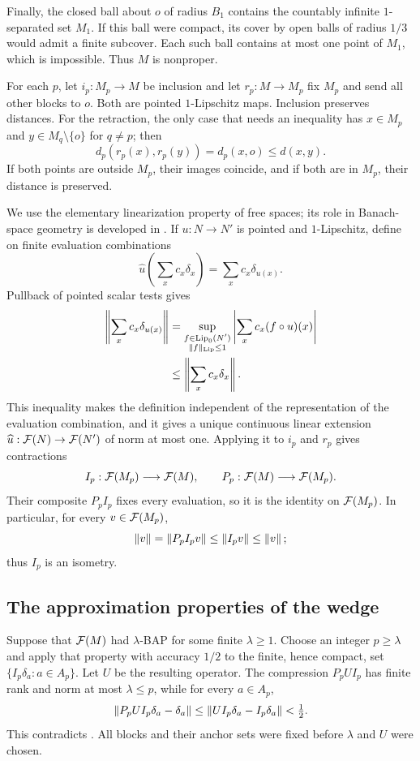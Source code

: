 Finally, the closed ball about $o$ of radius $B_1$ contains the
countably infinite $1$-separated set $M_1$. If this ball were compact,
its cover by open balls of radius $1/3$ would admit a finite subcover.
Each such ball contains at most one point of $M_1$, which is impossible.
Thus $M$ is nonproper.

For each $p$, let $i_p:M_p\to M$ be inclusion and let $r_p:M\to M_p$
fix $M_p$ and send all other blocks to $o$. Both are pointed
$1$-Lipschitz maps. Inclusion preserves distances. For the retraction,
the only case that needs an inequality has $x\in M_p$ and
$y\in M_q\setminus\{o\}$ for $q\ne p$; then
\[
 d_p(r_p(x),r_p(y))=d_p(x,o)\le d(x,y).
\]
If both points are outside $M_p$, their images coincide, and if both
are in $M_p$, their distance is preserved.

We use the elementary linearization property of free spaces; its role
in Banach-space geometry is developed in \cite[\S2]{GodefroyKalton03}.
If $u:N\to N'$ is pointed and $1$-Lipschitz, define on finite evaluation
combinations
\[
 \widehat u\left(\sum_x c_x\delta_x\right)=\sum_x c_x\delta_{u(x)}.
\]
Pullback of pointed scalar tests gives
\begin{align*}
 \left\|\sum_x c_x\delta_{u(x)}\right\|
 &=\sup_{\substack{f\in\operatorname{Lip}_0(N')\\\|f\|_{\mathrm{Lip}}\le1}}
       \left|\sum_x c_x(f\circ u)(x)\right|\\
 &\le\left\|\sum_x c_x\delta_x\right\|.
\end{align*}
This inequality makes the definition independent of the representation
of the evaluation combination, and it gives a unique continuous linear
extension $\widehat u:\mathcal F(N)\to\mathcal F(N')$ of norm at most one.
Applying it to $i_p$ and $r_p$ gives contractions
\[
 I_p:\mathcal F(M_p)\longrightarrow\mathcal F(M),\qquad
 P_p:\mathcal F(M)\longrightarrow\mathcal F(M_p).
\]
Their composite $P_pI_p$ fixes every evaluation, so it is the identity
on $\mathcal F(M_p)$. In particular, for every $v\in\mathcal F(M_p)$,
\[
 \left\|v\right\|=\left\|P_pI_pv\right\|\le\left\|I_pv\right\|\le\left\|v\right\|;
\]
thus $I_p$ is an isometry.

\subsection{The approximation properties of the wedge}

Suppose that $\mathcal F(M)$ had $\lambda$-BAP for some finite $\lambda\ge1$.
Choose an integer $p\ge\lambda$ and apply that property with accuracy
$1/2$ to the finite, hence compact, set
$\{I_p\delta_a:a\in A_p\}$. Let $U$ be the resulting operator.
The compression $P_pUI_p$ has finite rank and norm at most
$\lambda\le p$, while for every $a\in A_p$,
\[
 \left\|P_pUI_p\delta_a-\delta_a\right\|
 \le\left\|UI_p\delta_a-I_p\delta_a\right\|<\tfrac12.
\]
This contradicts . All blocks and their anchor sets
were fixed before $\lambda$ and $U$ were chosen.

